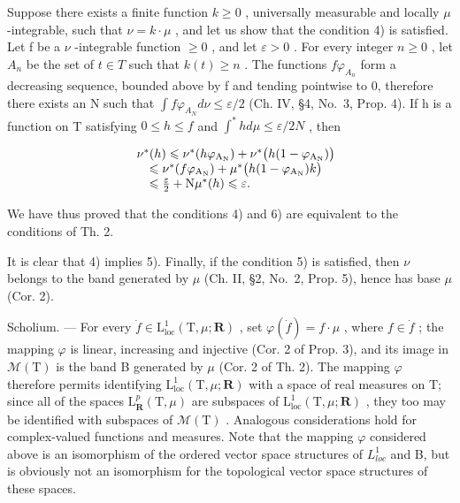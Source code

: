 Suppose there exists a finite function \(k \geqslant 0\) , universally measurable and locally \(\mu\) -integrable, such that \(\nu = k \cdot \mu\) , and let us show that the condition 4) is satisfied. Let f be a \(\nu\) -integrable function \(\geqslant 0\) , and let \(\varepsilon > 0\) . For every integer \(n \geqslant 0\) , let \(A_{n}\) be the set of \(t \in T\) such that \(k(t) \geqslant n\) . The functions \(f\varphi_{A_{n}}\) form a decreasing sequence, bounded above by f and tending pointwise to 0, therefore there exists an N such that \(\int f\varphi_{A_{N}} d\nu \leqslant \varepsilon/2\) (Ch. IV, §4, No.~3, Prop. 4). If h is a function on T satisfying \(0 \leqslant h \leqslant f\) and \(\int^{*} h d\mu \leqslant \varepsilon/2N\) , then

\[
\begin{array}{r l} & {\nu^ {*} (h) \leqslant \nu^ {*} (h \varphi_ {\mathrm {A_ {N}}}) + \nu^ {*} \big (h (1 - \varphi_ {\mathrm {A_ {N}}}) \big)} \\ & {\quad \leqslant \nu^ {*} (f \varphi_ {\mathrm {A_ {N}}}) + \mu^ {*} \big (h (1 - \varphi_ {\mathrm {A_ {N}}}) k \big)} \\ & {\quad \leqslant \frac {\varepsilon}{2} + \mathrm{N} \mu^ {*} (h) \leqslant \varepsilon .} \end{array}
\]

We have thus proved that the conditions 4) and 6) are equivalent to the conditions of Th. 2.

It is clear that 4) implies 5). Finally, if the condition 5) is satisfied, then \(\nu\) belongs to the band generated by \(\mu\) (Ch. II, §2, No.~2, Prop. 5), hence has base \(\mu\) (Cor. 2).

Scholium. --- For every \(\dot{f} \in \mathrm{L}_{\mathrm{loc}}^{1}(\mathrm{T}, \mu; \mathbf{R})\) , set \(\varphi(\dot{f}) = f \cdot \mu\) , where \(f \in \dot{f}\) ; the mapping \(\varphi\) is linear, increasing and injective (Cor. 2 of Prop. 3), and its image in \(\mathcal{M}(\mathrm{T})\) is the band B generated by \(\mu\) (Cor. 2 of Th. 2). The mapping \(\varphi\) therefore permits identifying \(\mathrm{L}_{\mathrm{loc}}^{1}(\mathrm{T},\mu;\mathbf{R})\) with a space of real measures on T; since all of the spaces \(\mathrm{L}_{\mathbf{R}}^{p}(\mathrm{T},\mu)\) are subspaces of \(\mathrm{L}_{\mathrm{loc}}^{1}(\mathrm{T},\mu;\mathbf{R})\) , they too may be identified with subspaces of \(\mathcal{M}(\mathrm{T})\) . Analogous considerations hold for complex-valued functions and measures. Note that the mapping \(\varphi\) considered above is an isomorphism of the ordered vector space structures of \(L_{loc}^{1}\) and B, but is obviously not an isomorphism for the topological vector space structures of these spaces.

